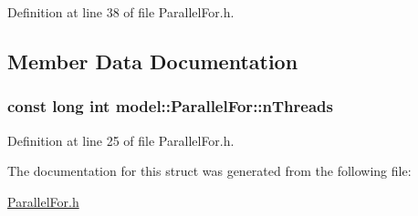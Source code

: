 Definition at line 38 of file Parallel\+For.\+h.



\subsection{Member Data Documentation}
\hypertarget{structmodel_1_1_parallel_for_ad949adaf7dec8df3422b1fe6c370bbdb}{}
\subsubsection[{n\+Threads}]{\setlength{\rightskip}{0pt plus 5cm}const long int model\+::\+Parallel\+For\+::n\+Threads}\label{structmodel_1_1_parallel_for_ad949adaf7dec8df3422b1fe6c370bbdb}


Definition at line 25 of file Parallel\+For.\+h.



The documentation for this struct was generated from the following file\+:\begin{DoxyCompactItemize}
\item 
\hyperlink{_parallel_for_8h}{Parallel\+For.\+h}\end{DoxyCompactItemize}
